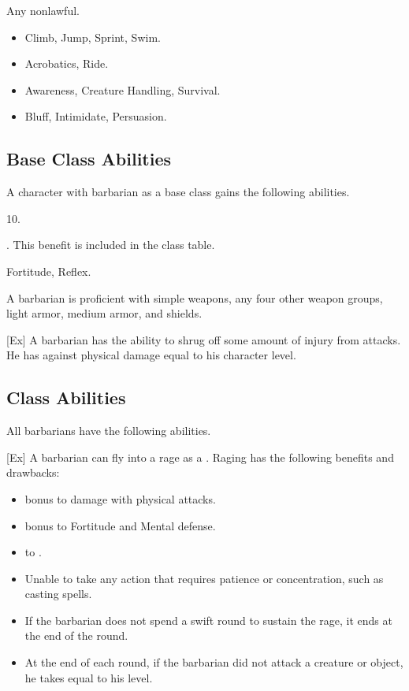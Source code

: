      Any nonlawful.

    \begin{itemize}
        \item {} Climb, Jump, Sprint, Swim.
        \item {} Acrobatics, Ride.
        \item {} Awareness, Creature Handling, Survival.
        \item {} Bluff, Intimidate, Persuasion.
    \end{itemize}

    \subsection{Base Class Abilities}
        A character with barbarian as a base class gains the following abilities.

         10.

         . This benefit is included in the class table.

          Fortitude,  Reflex.

        A barbarian is proficient with simple weapons, any four other weapon groups, light armor, medium armor, and shields.

        [Ex]
        A barbarian has the ability to shrug off some amount of injury from attacks.
        He has  against physical damage equal to his character level.

    \subsection{Class Abilities}
        All barbarians have the following abilities.

        [Ex]\label{Rage}
        A barbarian can fly into a rage as a .
        Raging has the following benefits and drawbacks:
        \begin{itemize}
            \item {} bonus to damage with physical attacks.
            \item {} bonus to Fortitude and Mental defense.
            \item {} to .
            \item Unable to take any action that requires patience or concentration, such as casting spells.
            \item If the barbarian does not spend a swift round to sustain the rage, it ends at the end of the round.
            \item At the end of each round, if the barbarian did not attack a creature or object, he takes  equal to his level.
        \end{itemize}

